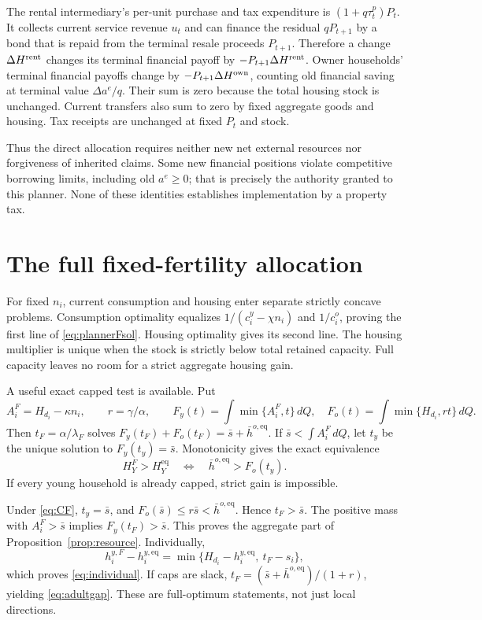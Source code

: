 \documentclass[11pt]{article}
\newcommand{\dd}{\,d}
\newcommand{\eq}{\mathrm{eq}}
\begin{document}
The rental intermediary's per-unit purchase and tax expenditure is $(1+q\tau_t^p)P_t$. It collects current service revenue $u_t$ and can finance the residual $qP_{t+1}$ by a bond that is repaid from the terminal resale proceeds $P_{t+1}$. Therefore a change $\Delta H^{\rm rent}$ changes its terminal financial payoff by $-P_{t+1}\Delta H^{\rm rent}$. Owner households' terminal financial payoffs change by $-P_{t+1}\Delta H^{\rm own}$, counting old financial saving at terminal value $\Delta a^e/q$. Their sum is zero because the total housing stock is unchanged. Current transfers also sum to zero by fixed aggregate goods and housing. Tax receipts are unchanged at fixed $P_t$ and stock.

Thus the direct allocation requires neither new net external resources nor forgiveness of inherited claims. Some new financial positions violate competitive borrowing limits, including old $a^e\ge0$; that is precisely the authority granted to this planner. None of these identities establishes implementation by a property tax.

\section{The full fixed-fertility allocation}\label{app:fixed}
For fixed $n_i$, current consumption and housing enter separate strictly concave problems. Consumption optimality equalizes $1/(c_i^y-\chi n_i)$ and $1/c_i^o$, proving the first line of \eqref{eq:plannerFsol}. Housing optimality gives its second line. The housing multiplier is unique when the stock is strictly below total retained capacity. Full capacity leaves no room for a strict aggregate housing gain.

A useful exact capped test is available. Put
\[
 A_i^F=H_{d_i}-\kappa n_i,\qquad r=\gamma/\alpha,\qquad
 F_y(t)=\int\min\{A_i^F,t\}\dd Q,\quad F_o(t)=\int\min\{H_{d_i},rt\}\dd Q.
\]
Then $t_F=\alpha/\lambda_F$ solves
$F_y(t_F)+F_o(t_F)=\bar s+\bar h^{o,\eq}$.
If $\bar s<\int A_i^F\dd Q$, let $t_y$ be the unique solution to $F_y(t_y)=\bar s$. Monotonicity gives the exact equivalence
\begin{equation}
 H_Y^F>H_Y^{\eq}\quad\Longleftrightarrow\quad
 \bar h^{o,\eq}>F_o(t_y).\label{eq:exactcaptest}
\end{equation}
If every young household is already capped, strict gain is impossible.

Under \eqref{eq:CF}, $t_y=\bar s$, and
$F_o(\bar s)\le r\bar s<\bar h^{o,\eq}$. Hence $t_F>\bar s$. The positive mass with $A_i^F>\bar s$ implies $F_y(t_F)>\bar s$. This proves the aggregate part of Proposition~\ref{prop:resource}. Individually,
\begin{equation}
 h_i^{y,F}-h_i^{y,\eq}
 =\min\{H_{d_i}-h_i^{y,\eq},\ t_F-s_i\},\label{eq:individualdiff}
\end{equation}
which proves \eqref{eq:individual}. If caps are slack,
$t_F=(\bar s+\bar h^{o,\eq})/(1+r)$, yielding \eqref{eq:adultgap}. These are full-optimum statements, not just local directions.
\end{document}

